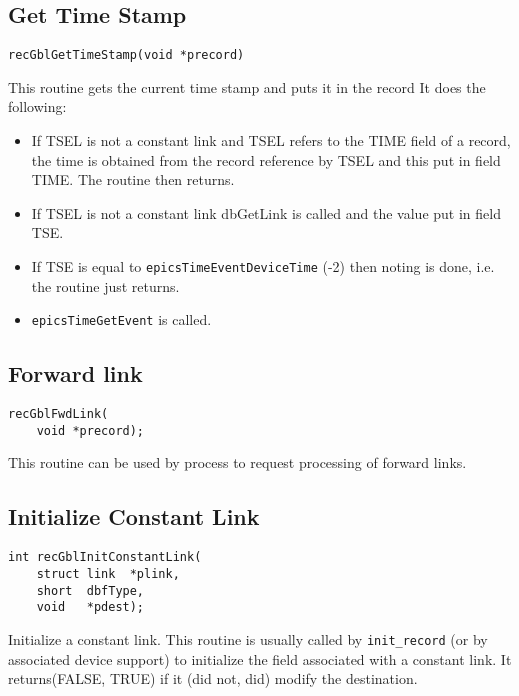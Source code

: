 \subsection{Get Time Stamp}

\begin{verbatim}
recGblGetTimeStamp(void *precord)
\end{verbatim}

This routine gets the current time stamp and puts it in the record It does the following:

\begin{itemize}
\item If TSEL is not a constant link and TSEL refers to the TIME field of a record, the time is obtained from the record 
reference by TSEL and this put in field TIME. The routine then returns.

\item If TSEL is not a constant link dbGetLink is called and the value put in field TSE.

\item If TSE is equal to \verb|epicsTimeEventDeviceTime|  (-2) then noting is done, i.e. the routine just returns.

\item \verb|epicsTimeGetEvent| is called.

\end{itemize}

\subsection{Forward link}

\begin{verbatim}
recGblFwdLink(
    void *precord);
\end{verbatim}

This routine can be used by process to request processing of forward links.

\subsection{Initialize Constant Link}

\begin{verbatim}
int recGblInitConstantLink(
    struct link  *plink,
    short  dbfType,
    void   *pdest);
\end{verbatim}

Initialize a constant link. This routine is usually called by \verb|init_record| (or by associated device support) to initialize 
the field associated with a constant link. It returns(FALSE, TRUE) if it (did not, did) modify the destination.
